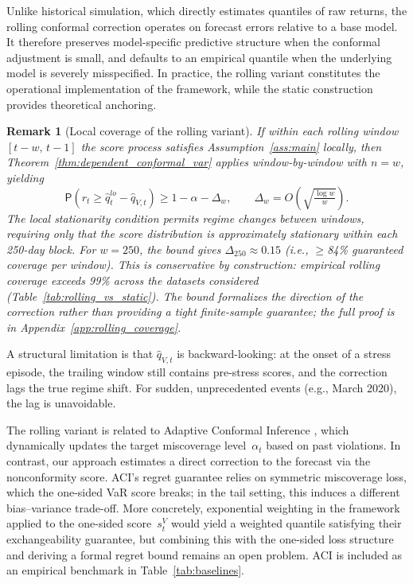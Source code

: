 \documentclass[preprint,11pt,authoryear]{elsarticle}
\newtheorem{remark}[theorem]{Remark}
\renewcommand{\P}{\mathsf{P}}
\newcommand{\1}{\boldsymbol{1}}
\begin{document}
	Unlike historical simulation, which directly estimates quantiles of raw returns, the rolling conformal correction operates on forecast errors relative to a base model. It therefore preserves model-specific predictive structure when the conformal adjustment is small, and defaults to an empirical quantile when the underlying model is severely misspecified.
	In practice, the rolling variant constitutes the operational implementation of the framework, while the static construction provides theoretical anchoring.

	\begin{remark}[Local coverage of the rolling variant]
		\label{rem:rolling_coverage}
		If within each rolling window $[t-w,\, t-1]$ the score process satisfies Assumption~\ref{ass:main} locally, then Theorem~\ref{thm:dependent_conformal_var} applies window-by-window with $n = w$, yielding
		\[
		\P\!\left(r_t \geq \hat{q}_t^{lo} - \hat{q}_{V,t}\right) \geq 1 - \alpha - \Delta_w, \qquad \Delta_w = O\!\left(\sqrt{\tfrac{\log w}{w}}\right).
		\]
		The local stationarity condition permits regime changes \emph{between} windows, requiring only that the score distribution is approximately stationary within each 250-day block. For $w = 250$, the bound gives $\Delta_{250} \approx 0.15$ (i.e., $\geq$84\% guaranteed coverage per window). This is conservative by construction: empirical rolling coverage exceeds 99\% across the datasets considered (Table~\ref{tab:rolling_vs_static}). The bound formalizes the direction of the correction rather than providing a tight finite-sample guarantee; the full proof is in Appendix~\ref{app:rolling_coverage}.
	\end{remark}

	A structural limitation is that $\hat{q}_{V,t}$ is
	backward-looking: at the onset of a stress episode, the trailing
	window still contains pre-stress scores, and the correction
	lags the true regime shift. For sudden, unprecedented
	events (e.g., March 2020), the lag is unavoidable.

	The rolling variant is related to Adaptive Conformal Inference \citep{gibbs2021adaptive}, which dynamically updates the target miscoverage level~$\alpha_t$ based on past violations. In contrast, our approach estimates a direct correction to the forecast via the nonconformity score. ACI's regret guarantee relies on symmetric miscoverage loss, which the one-sided VaR score breaks; in the tail setting, this induces a different bias--variance trade-off. More concretely, exponential weighting in the \citet{barber2023conformal} framework applied to the one-sided score~$s_t^V$ would yield a weighted quantile satisfying their exchangeability guarantee, but combining this with the one-sided loss structure and deriving a formal regret bound remains an open problem. ACI is included as an empirical benchmark in Table~\ref{tab:baselines}.
\end{document}

